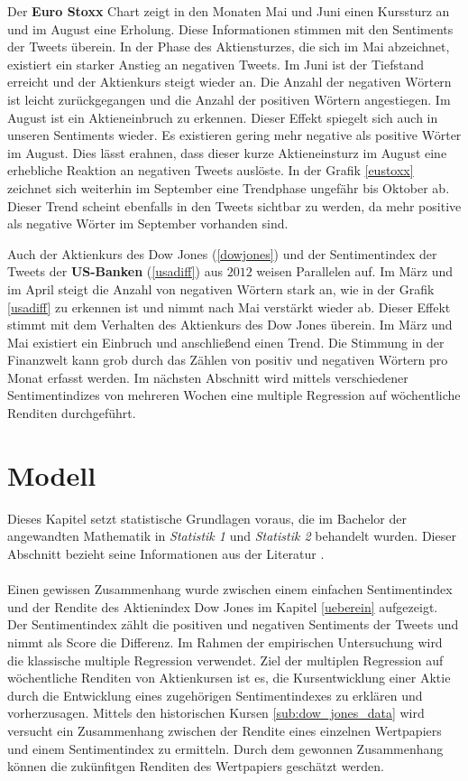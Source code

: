Der \textbf{Euro Stoxx} Chart zeigt in den Monaten Mai und Juni einen Kurssturz an und im August eine Erholung. Diese Informationen stimmen mit den Sentiments der Tweets überein. In der Phase des Aktiensturzes, die sich im Mai abzeichnet, existiert ein starker Anstieg an negativen Tweets. Im Juni ist der Tiefstand erreicht und der Aktienkurs steigt wieder an. Die Anzahl der negativen Wörtern ist leicht zurückgegangen und die Anzahl der positiven Wörtern angestiegen. Im August ist ein Aktieneinbruch zu erkennen. Dieser Effekt spiegelt sich auch in unseren Sentiments wieder. Es existieren gering mehr negative als positive Wörter im August. Dies lässt erahnen, dass dieser kurze Aktieneinsturz im August eine erhebliche Reaktion an negativen Tweets auslöste. In der Grafik \ref{eustoxx} zeichnet sich weiterhin im September eine Trendphase ungefähr bis Oktober ab. Dieser Trend scheint ebenfalls in den Tweets sichtbar zu werden, da mehr positive als negative Wörter im September vorhanden sind. 

Auch der Aktienkurs des Dow Jones (\ref{dowjones}) und der Sentimentindex der Tweets der \textbf{US-Banken} (\ref{usadiff}) aus $2012$ weisen Parallelen auf. Im März und im April steigt die Anzahl von negativen Wörtern stark an, wie in der Grafik \ref{usadiff} zu erkennen ist und nimmt nach Mai verstärkt wieder ab. Dieser Effekt stimmt mit dem Verhalten des Aktienkurs des Dow Jones überein. Im März und Mai existiert ein Einbruch und anschließend einen Trend. Die Stimmung in der Finanzwelt kann grob durch das Zählen von positiv und negativen Wörtern pro Monat erfasst werden. Im nächsten Abschnitt wird mittels verschiedener Sentimentindizes von mehreren Wochen eine multiple Regression auf wöchentliche Renditen durchgeführt.

\newpage

\section{Modell}\label{Modell}
Dieses Kapitel setzt statistische Grundlagen voraus, die im Bachelor der angewandten Mathematik in \textit{Statistik 1} und \textit{Statistik 2} behandelt wurden. Dieser Abschnitt bezieht seine Informationen aus der Literatur \cite{becker}. \\
\\
Einen gewissen Zusammenhang wurde zwischen einem einfachen Sentimentindex und der Rendite des Aktienindex Dow Jones im Kapitel \ref{ueberein} aufgezeigt. Der Sentimentindex zählt die positiven und negativen Sentiments der Tweets und nimmt als Score die Differenz. Im Rahmen der empirischen Untersuchung wird die klassische multiple Regression verwendet. Ziel der multiplen Regression auf wöchentliche Renditen von Aktienkursen ist es, die Kursentwicklung einer Aktie durch die Entwicklung eines zugehörigen Sentimentindexes zu erklären und vorherzusagen. Mittels den historischen Kursen \ref{sub:dow_jones_data} wird versucht ein Zusammenhang zwischen der Rendite eines einzelnen Wertpapiers und einem Sentimentindex zu ermitteln. Durch dem gewonnen Zusammenhang können die zukünfitgen Renditen des Wertpapiers geschätzt werden.

